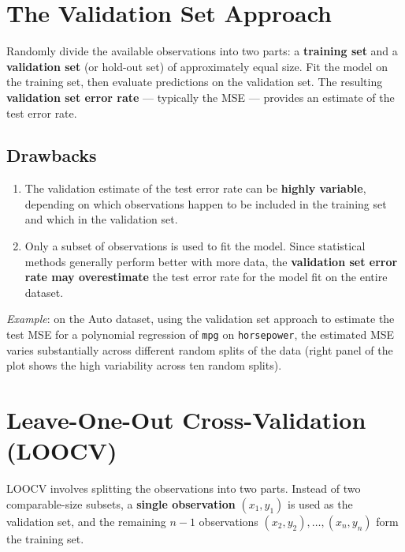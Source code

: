 \documentclass[11pt,a4paper]{article}
\theoremstyle{definition}
\theoremstyle{plain}
\theoremstyle{remark}
\begin{document}
\section{The Validation Set Approach}

\begin{tcolorbox}[colback=blue!5!white,colframe=blue!75!black,title=\textbf{Validation Set Approach}]
Randomly divide the available observations into two parts: a \textbf{training set} and a \textbf{validation set} (or hold-out set) of approximately equal size. Fit the model on the training set, then evaluate predictions on the validation set. The resulting \textbf{validation set error rate} — typically the MSE — provides an estimate of the test error rate.
\end{tcolorbox}

\subsection{Drawbacks}

\begin{enumerate}
    \item The validation estimate of the test error rate can be \textbf{highly variable}, depending on which observations happen to be included in the training set and which in the validation set.
    \item Only a subset of observations is used to fit the model. Since statistical methods generally perform better with more data, the \textbf{validation set error rate may overestimate} the test error rate for the model fit on the entire dataset.
\end{enumerate}

\textit{Example}: on the Auto dataset, using the validation set approach to estimate the test MSE for a polynomial regression of \texttt{mpg} on \texttt{horsepower}, the estimated MSE varies substantially across different random splits of the data (right panel of the plot shows the high variability across ten random splits).

\section{Leave-One-Out Cross-Validation (LOOCV)}

\begin{tcolorbox}[colback=blue!5!white,colframe=blue!75!black,title=\textbf{Leave-One-Out Cross-Validation}]
LOOCV involves splitting the observations into two parts. Instead of two comparable-size subsets, a \textbf{single observation} $(x_1, y_1)$ is used as the validation set, and the remaining $n-1$ observations $(x_2, y_2), \ldots, (x_n, y_n)$ form the training set.
\end{tcolorbox}
\end{document}
